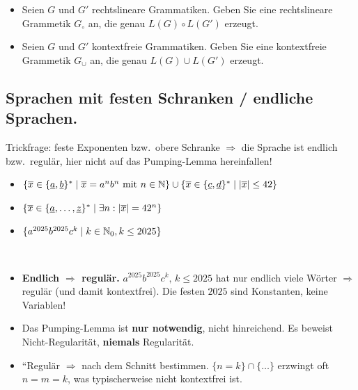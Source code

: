 \begin{itemize}
    \item Seien $G$ und $G'$ rechtslineare Grammatiken.
    Geben Sie eine rechtslineare Grammetik $G_{\circ}$ an, die
    genau $L(G) \circ L(G')$ erzeugt. 
    \item Seien $G$ und $G'$ kontextfreie Grammatiken.
    Geben Sie eine kontextfreie Grammetik $G_{\cup}$ an, die
    genau $L(G) \cup L(G')$ erzeugt. 
\end{itemize}

\subsection{Sprachen mit festen Schranken / endliche Sprachen.}
Trickfrage: feste Exponenten bzw.\ obere Schranke $\Rightarrow$ die Sprache ist
endlich bzw.\ regulär, hier nicht auf das Pumping-Lemma hereinfallen!

\begin{itemize}
    \item $\{\overline{x} \in \{\underline{a}, \underline{b}\}^* \mid  \overline{x} = a^n b^n \text{ mit } n \in \mathbb{N}\} \cup \{ \overline{x} \in \{\underline{c}, \underline{d}\}^* \mid |\overline{x}| \leq 42 \}$ 
    \item $\{ \overline{x} \in \{\underline{a}, \dots, \underline{z}\}^* \mid \exists n: |\overline{x}| = 42^n \}$ 
    \item $\{a^{2025} b^{2025} c^k \mid k \in \mathbb{N}_0, k \leq 2025 \}$ 
\end{itemize}

\begin{warn} $\ $
\begin{itemize}
    \item \textbf{Endlich $\Rightarrow$ regulär.} $a^{2025}b^{2025}c^{k},\,k\le2025$ hat nur endlich viele Wörter
    $\Rightarrow$ regulär (und damit kontextfrei).
    Die festen $2025$ sind Konstanten, keine Variablen!
    \item Das Pumping-Lemma ist \textbf{nur notwendig}, nicht hinreichend.
    Es beweist Nicht-Regularität,
    \textbf{niemals} Regularität.
    \item ``Regulär $\Rightarrow$ nach dem Schnitt bestimmen. $\{n=k\}\cap\{\dots\}$ erzwingt oft
    $n=m=k$, was typischerweise nicht kontextfrei ist.
\end{itemize}
\end{warn}

